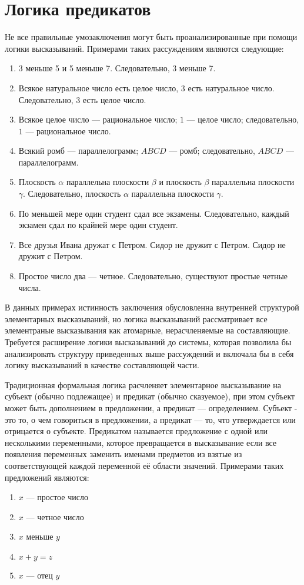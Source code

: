 \documentclass[letterpaper, 10pt]{article}
\theoremstyle{definition}
\begin{document}
\section{Логика предикатов}
	Не все правильные умозаключения могут быть проанализированные при помощи
	логики высказываний. Примерами таких рассуждениям являются следующие:
	\begin{enumerate}
		\item 3 меньше 5 и 5 меньше 7. Следовательно, 3 меньше 7.
		\item Всякое натуральное число есть целое число, 3 есть натуральное
			число. Следовательно, 3 есть целое число.
		\item Всякое целое число --- рациональное число; $1$ --- целое число;
			следовательно, $1$ --- рациональное число.
		\item Всякий ромб --- параллелограмм; $ABCD$ --- ромб; следовательно,
			$ABCD$ --- параллелограмм.
		\item Плоскость $\alpha$ параллельна плоскости $\beta$ и плоскость
			$\beta$ параллельна плоскости $\gamma$. Следовательно, плоскость
			$\alpha$ параллельна плоскости $\gamma$.
		\item По меньшей мере один студент сдал все экзамены. Следовательно,
			каждый экзамен сдал по крайней мере один студент.
		\item Все друзья Ивана дружат с Петром. Сидор не дружит с Петром. Сидор
			не дружит с Петром.
		\item Простое число два --- четное. Следовательно, существуют простые
			четные числа.
	\end{enumerate}

	В данных примерах истинность заключения обусловленна внутренней структурой
	элементарных высказываний, но логика высказываний рассматривает все
	элементраные высказывания как атомарные, нерасчленяемые на составляющие.
	Требуется расширение логики высказываний до системы, которая позволила бы
	анализировать структуру приведенных выше рассуждений и включала бы в себя логику
	высказываний в качестве составляющей части.

	Традиционная формальная логика расчленяет элементарное высказывание на
	субъект (обычно подлежащее) и предикат (обычно сказуемое), при этом субъект
	может быть дополнением в предложении, а предикат --- определением. Субъект -
	это то, о чем говориться в предложении, а предикат --- то, что утверждается
	или отрицается о субъекте.
	Предикатом называется предложение с одной или несколькими
	переменными, которое превращается в высказывание если все появления
	переменных заменить именами предметов из взятые из соответствующей каждой
	переменной её области значений.
	Примерами таких предложений являются:
	\begin{enumerate}
		\item $x$ --- простое число
		\item $x$ --- четное число
		\item $x$ меньше $y$
		\item $x + y = z$
		\item $x$ --- отец $y$
	\end{enumerate}
	
\end{document}
